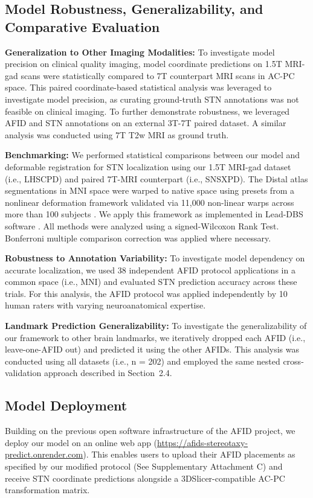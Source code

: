 \subsection{Model Robustness, Generalizability, and Comparative Evaluation}

\textbf{Generalization to Other Imaging Modalities:} To investigate model precision on clinical quality imaging, model coordinate predictions on 1.5T MRI-gad scans were statistically compared to 7T counterpart MRI scans in AC-PC space. This paired coordinate-based statistical analysis was leveraged to investigate model precision, as curating ground-truth STN annotations was not feasible on clinical imaging. To further demonstrate robustness, we leveraged AFID and STN annotations on an external 3T-7T paired dataset. A similar analysis was conducted using 7T T2w MRI as ground truth.

\textbf{Benchmarking:} We performed statistical comparisons between our model and deformable registration for STN localization using our 1.5T MRI-gad dataset (i.e., LHSCPD) and paired 7T-MRI counterpart (i.e., SNSXPD). The Distal atlas segmentations in MNI space \cite{chakravarty2006, ewert2018} were warped to native space using presets from a nonlinear deformation framework validated via 11,000 non-linear warps across more than 100 subjects \cite{ewert2019}. We apply this framework as implemented in Lead-DBS software \cite{ref}. All methods were analyzed using a signed-Wilcoxon Rank Test. Bonferroni multiple comparison correction was applied where necessary.

\textbf{Robustness to Annotation Variability:} To investigate model dependency on accurate localization, we used 38 independent AFID protocol applications in a common space (i.e., MNI) and evaluated STN prediction accuracy across these trials. For this analysis, the AFID protocol was applied independently by 10 human raters with varying neuroanatomical expertise.

\textbf{Landmark Prediction Generalizability:} To investigate the generalizability of our framework to other brain landmarks, we iteratively dropped each AFID (i.e., leave-one-AFID out) and predicted it using the other AFIDs. This analysis was conducted using all datasets (i.e., n = 202) and employed the same nested cross-validation approach described in Section~2.4.

\subsection{Model Deployment}
Building on the previous open software infrastructure of the AFID project, we deploy our model on an online web app (\url{https://afids-stereotaxy-predict.onrender.com}). This enables users to upload their AFID placements as specified by our modified protocol (See Supplementary Attachment C) and receive STN coordinate predictions alongside a 3DSlicer-compatible AC-PC transformation matrix.



